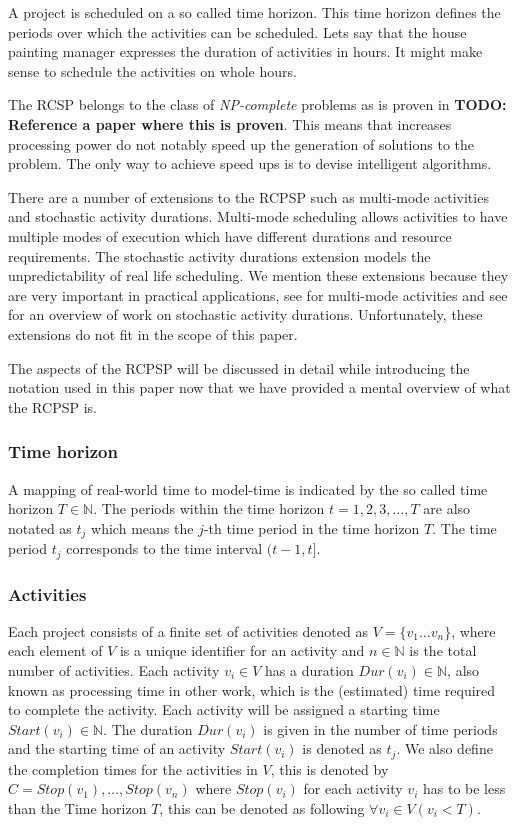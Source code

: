 \documentclass{article}
\newcommand{\TODO}[1]{{\color{red}\textbf{TODO: #1}}}
\newcommand{\dur}[1]{\ensuremath{Dur(v_{#1})}} %
\newcommand{\start}[1]{\ensuremath{Start(v_{#1})}} %
\renewcommand{\stop}[1]{\ensuremath{Stop(v_{#1})}} %
\begin{document}
A project is scheduled on a so called time horizon. This time horizon defines the periods over which the activities can be scheduled. Lets say that the house painting manager expresses the duration of activities in hours. It might make sense to schedule the activities on whole hours. 

The RCSP belongs to the class of \emph{NP-complete} problems as is proven in \TODO{Reference a paper where this is proven}. This means that increases processing power do not notably speed up the generation of solutions to the problem. The only way to achieve speed ups is to devise intelligent algorithms. 

There are a number of extensions to the RCPSP such as multi-mode activities and stochastic activity durations. Multi-mode scheduling allows activities to have multiple modes of execution which have different durations and resource requirements. The stochastic activity durations extension models the unpredictability of real life scheduling. We mention these extensions because they are very important in practical applications, see \citet{deblaere10} for multi-mode activities and see \citet{brucker99} for an overview of work on stochastic activity durations. Unfortunately, these extensions do not fit in the scope of this paper. 

The aspects of the RCPSP will be discussed in detail while introducing the notation used in this paper now that we have provided a mental overview of what the RCPSP is. 

\subsubsection{Time horizon}
A mapping of real-world time to model-time is indicated by the so called time horizon $T \in \mathbb{N}$. 
The periods within the time horizon $t=1,2,3,\ldots,T$ are also notated as $t_j$ which means the $j$-th time period in the time horizon $T$. 
The time period $t_j$ corresponds to the time interval $(t-1,t]$. 

\subsubsection{Activities}
Each project consists of a finite set of activities denoted as $V = \{v_1 \ldots v_n\}$, where each element of $V$ is a unique identifier for an activity and $n \in \mathbb{N}$ is the total number of activities.
Each activity $v_i \in V$ has a duration $\dur{i} \in \mathbb{N}$, also known as processing time in other work, which is the (estimated) time required to complete the activity. 
Each activity will be assigned a starting time $\start{i} \in \mathbb{N}$. 
The duration \dur{i} is given in the number of time periods and the starting time of an activity \start{i} is denoted as $t_j$. 
We also define the completion times for the activities in $V$, this is denoted by $C = \stop{1},\ldots,\stop{n}$ where \stop{i} for each activity $v_i$ has to be less than the Time horizon $T$, this can be denoted as following $\forall{v_i \in V}(v_i < T)$.
\end{document}
